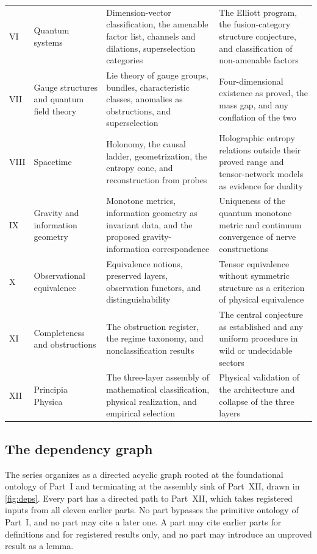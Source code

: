 \documentclass[11pt,letterpaper]{article}
\theoremstyle{definition}
\theoremstyle{remark}
\begin{document}
\begin{xltabular}{\textwidth}{Y{0.35}Y{1.15}Y{1.55}Y{0.95}}
VI & Quantum systems & Dimension-vector classification, the amenable factor list, channels and dilations, superselection categories & The Elliott program, the fusion-category structure conjecture, and classification of non-amenable factors \\
VII & Gauge structures and quantum field theory & Lie theory of gauge groups, bundles, characteristic classes, anomalies as obstructions, and superselection & Four-dimensional existence as proved, the mass gap, and any conflation of the two \\
VIII & Spacetime & Holonomy, the causal ladder, geometrization, the entropy cone, and reconstruction from probes & Holographic entropy relations outside their proved range and tensor-network models as evidence for duality \\
IX & Gravity and information geometry & Monotone metrics, information geometry as invariant data, and the proposed gravity-information correspondence & Uniqueness of the quantum monotone metric and continuum convergence of nerve constructions \\
X & Observational equivalence & Equivalence notions, preserved layers, observation functors, and distinguishability & Tensor equivalence without symmetric structure as a criterion of physical equivalence \\
XI & Completeness and obstructions & The obstruction register, the regime taxonomy, and nonclassification results & The central conjecture as established and any uniform procedure in wild or undecidable sectors \\
XII & Principia Physica & The three-layer assembly of mathematical classification, physical realization, and empirical selection & Physical validation of the architecture and collapse of the three layers \\
\end{xltabular}
\endgroup

\subsection{The dependency graph}

The series organizes as a directed acyclic graph rooted at the foundational ontology of Part~I and terminating at the assembly sink of Part~XII, drawn in \cref{fig:deps}. Every part has a directed path to Part~XII, which takes registered inputs from all eleven earlier parts. No part bypasses the primitive ontology of Part~I, and no part may cite a later one. A part may cite earlier parts for definitions and for registered results only, and no part may introduce an unproved result as a lemma.
\end{document}
